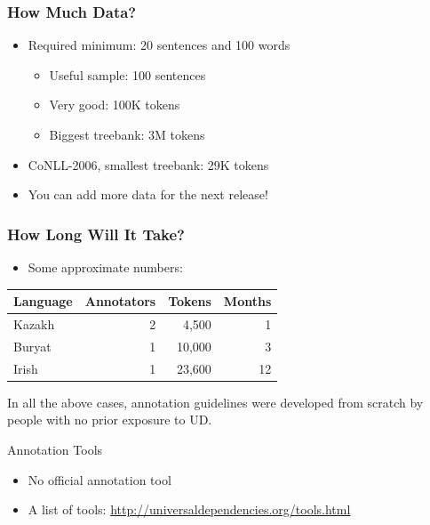 \documentclass[10pt, compress, aspectratio=169]{beamer}
\begin{document}
\begin{frame}[fragile]
  \frametitle{How Much Data?}
  \begin{itemize}
    \item \alert{Required minimum:} 20 sentences and 100 words
    \begin{itemize}
      \item Useful sample: 100 sentences
      \item Very good: 100K tokens
      \item Biggest treebank: 3M tokens
    \end{itemize}
    \item CoNLL-2006, smallest treebank: 29K tokens
    \bigskip
    \item You can add more data for the next release!
  \end{itemize}
\end{frame}


\begin{frame}
  \frametitle{How Long Will It Take?}
  \begin{itemize}
    \item Some approximate numbers:
  \end{itemize}
  \begin{center}
  \begin{tabular}{lrrr}
    \textbf{Language} & \textbf{Annotators} & \textbf{Tokens} & \textbf{Months} \\
    \hline
    Kazakh & 2 & 4,500 & 1 \\
    Buryat & 1 & 10,000 & 3 \\
    Irish &  1 & 23,600 & 12 \\
    \hline
  \end{tabular}
  \end{center}
  In all the above cases, annotation guidelines were developed from scratch
  by people with no prior exposure to UD.
\end{frame}


\begin{frame}{Annotation Tools}
  \begin{itemize}
    \item No official annotation tool
    \item A list of tools:
        \url{http://universaldependencies.org/tools.html}
  \end{itemize}
\end{frame}
\end{document}
